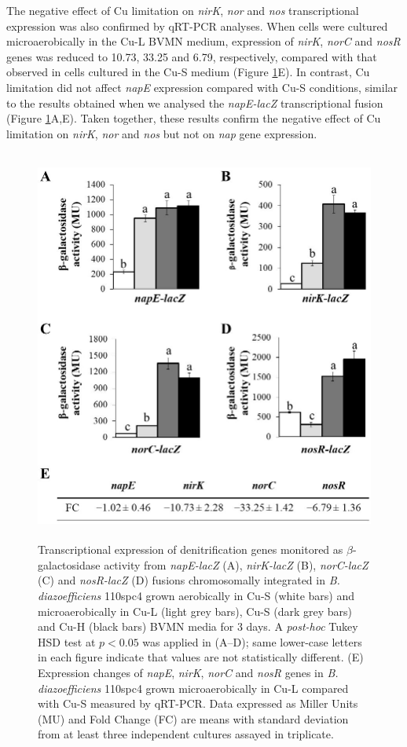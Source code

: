 \documentclass[a4paper,11pt]{article}
\begin{document}
The negative effect of Cu limitation on {\em nirK}, {\em nor} and {\em nos} transcriptional expression was also confirmed by qRT-PCR analyses. When cells were cultured microaerobically in
the Cu-L BVMN medium, expression of {\em nirK}, {\em norC} and {\em nosR} genes was reduced to 10.73,
33.25 and 6.79, respectively, compared with that observed in cells cultured in the Cu-S
medium (Figure \ref{fig:figure2}E). In contrast, Cu limitation did not affect {\em napE} expression compared
with Cu-S conditions, similar to the results obtained when we analysed the {\em napE-lacZ}
transcriptional fusion (Figure \ref{fig:figure2}A,E). Taken together, these results confirm the negative
effect of Cu limitation on {\em nirK}, {\em nor} and {\em nos} but not on {\em nap} gene expression.
\begin{figure}[h!]
\centering
\includegraphics[height=13cm]{Images/Figure2 (2).jpg}
\caption{Transcriptional expression of denitrification genes monitored as $\beta$-galactosidase activity
from {\em napE-lacZ} (A), {\em nirK-lacZ} (B), {\em norC-lacZ} (C) and {\em nosR-lacZ} (D) fusions chromosomally integrated
in {\em B. diazoefficiens} 110spc4 grown aerobically in Cu-S (white bars) and microaerobically in Cu-L (light
grey bars), Cu-S (dark grey bars) and Cu-H (black bars) BVMN media for 3 days. A {\em post-hoc} Tukey
HSD test at $p<0.05$ was applied in (A–D); same lower-case letters in each figure indicate that
values are not statistically different. (E) Expression changes of {\em napE}, {\em nirK}, {\em norC} and {\em nosR} genes in
{\em B. diazoefficiens} 110spc4 grown microaerobically in Cu-L compared with Cu-S measured by qRT-PCR.
Data expressed as Miller Units (MU) and Fold Change (FC) are means with standard deviation from
at least three independent cultures assayed in triplicate.}
\label{fig:figure2}
\end{figure}
\end{document}
